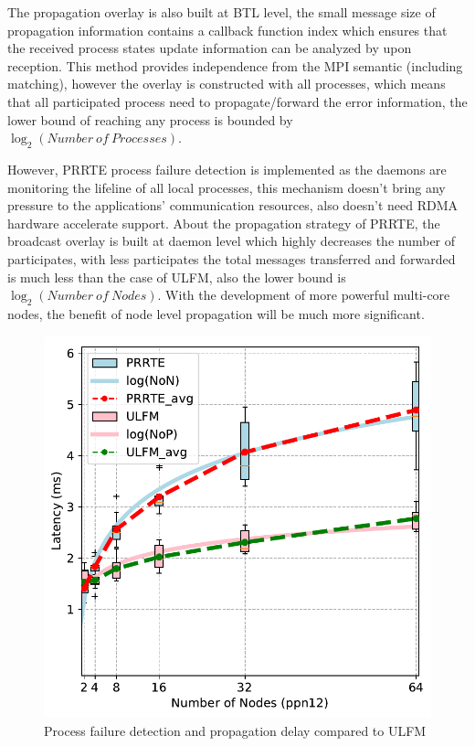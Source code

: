 \documentclass[sigconf]{acmart}
\begin{document}
The propagation overlay is also built at BTL level, the small message size of propagation information contains a callback function index which ensures that the received process states update information can be analyzed by upon reception. This method provides independence from the MPI semantic (including matching), however the overlay is constructed with all processes, which means that all participated process need to propagate/forward the error information, the lower bound of reaching any process is bounded by $\log_2({Number\ of\ Processes})$.  

However, PRRTE process failure detection is implemented as the daemons are monitoring the lifeline of all local processes, this mechanism doesn't bring any pressure to the applications' communication resources, also doesn't need RDMA hardware accelerate support. About the propagation strategy of PRRTE, the broadcast overlay is built at daemon level which highly decreases the number of participates, with less participates the total messages transferred and forwarded is much less than the case of ULFM, also the lower bound is $\log_2({Number\ of\ Nodes})$. With the development of more powerful multi-core nodes, the benefit of node level propagation will be much more significant.

\begin{figure}[h]
  \centering
  \includegraphics[width=\linewidth]{Process_Failure_log_fit.pdf}
  \caption{Process failure detection and propagation delay compared to ULFM}
\end{figure}
\end{document}
